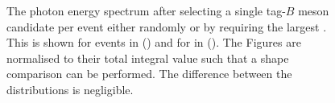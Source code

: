 \begin{figure}[hbtp!]
    \centering
    \caption{\label{fig:same_mode_best_tag_selection}
    The photon energy spectrum after selecting a single tag-$B$ meson candidate per event either randomly or by requiring the largest \feiProb.
    This is shown for \BptoXsgamma events in () 
    and for \BztoXsgamma in ().
    The Figures are normalised to their total integral value such that a shape comparison can be performed.
    The difference between the distributions is negligible.
    }
\end{figure}


